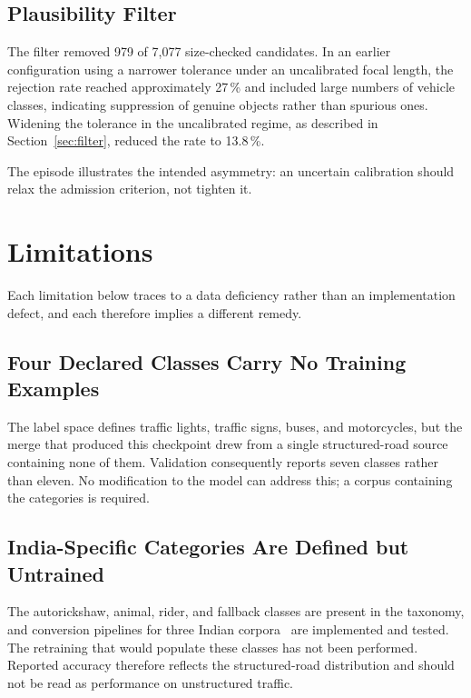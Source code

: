 \documentclass[11pt,a4paper]{report}
\begin{document}
\section{Plausibility Filter}

The filter removed 979 of 7{,}077 size-checked candidates. In an earlier
configuration using a narrower tolerance under an uncalibrated focal length, the
rejection rate reached approximately 27\,\% and included large numbers of
vehicle classes, indicating suppression of genuine objects rather than spurious
ones. Widening the tolerance in the uncalibrated regime, as described in
Section~\ref{sec:filter}, reduced the rate to 13.8\,\%.

The episode illustrates the intended asymmetry: an uncertain calibration should
relax the admission criterion, not tighten it.

\chapter{Limitations}
\label{ch:limits}

Each limitation below traces to a data deficiency rather than an implementation
defect, and each therefore implies a different remedy.

\section{Four Declared Classes Carry No Training Examples}

The label space defines traffic lights, traffic signs, buses, and motorcycles,
but the merge that produced this checkpoint drew from a single structured-road
source containing none of them. Validation consequently reports seven classes
rather than eleven. No modification to the model can address this; a corpus
containing the categories is required.

\section{India-Specific Categories Are Defined but Untrained}

The autorickshaw, animal, rider, and fallback classes are present in the
taxonomy, and conversion pipelines for three Indian
corpora~\cite{varma2019idd,kumar2025driveindia,iisc2025uvh26} are implemented
and tested. The retraining that would populate these classes has not been
performed. Reported accuracy therefore reflects the structured-road distribution
and should not be read as performance on unstructured traffic.
\end{document}
